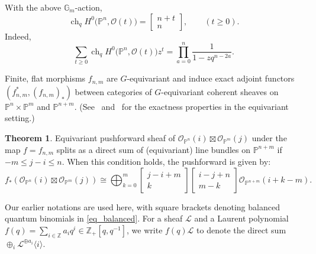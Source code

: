 \documentclass{article}
\def\Z{\mathbb Z}
\newcommand{\mcO}{\mathcal{O}}
\newcommand{\mcL}{\mathcal{L}}
\newcommand{\PP}{\mathbb{P}}
\DeclareMathOperator{\ch}{ch}
\newcommand{\bbinom}[2]{
  \begin{bmatrix}
    #1 \\
    #2
  \end{bmatrix}
}
\theoremstyle{definition}
\newtheorem{thm}{Theorem}[section]
\theoremstyle{definition}
\begin{document}
With the above $\mathbb{G}_m$-action,
\[
\ch_q H^0\bigl(\PP^n, \mathcal{O}(t)\bigr) = \begin{bmatrix} n+t \\ n \end{bmatrix}, \qquad (t \geq 0).
\]
Indeed,
\[
\sum_{t \geq 0} \ch_q H^0\bigl(\PP^n, \mathcal{O}(t)\bigr) z^t = \prod_{a=0}^n \frac{1}{1 - z q^{n-2a}}.
\]

Finite, flat morphisms $f_{n,m}$ are $G$-equivariant and induce exact adjoint functors $(f_{n,m}^{\ast},(f_{n,m})_{\ast})$ between categories of $G$-equivariant coherent sheaves on $\PP^n\times \PP^m$ and $\PP^{n+m}$. (See~\cite[\S 2.2.1.]{Merkurjev} and~\cite[\S 1.5]{Thomason} for the exactness properties in the equivariant setting.)

\begin{thm}\label{thm_pushforward_equiv} Equivariant pushforward sheaf of $\mcO_{\PP^n}(i) \boxtimes \mcO_{\PP^m}(j)$ under the map $f=f_{n,m}$ splits as a direct sum of (equivariant) line bundles on $\PP^{n+m}$ if  $-m \le j - i \le n$. When this condition holds, the pushforward is given by:
\begin{equation}\label{eq_f_decomposition_equiv}
f_{\ast}(\mcO_{\PP^n}(i) \boxtimes \mcO_{\PP^m}(j)) \cong \bigoplus_{k=0}^{m} \bbinom{j-i+m}{k} \bbinom{i-j+n}{m-k}\mcO_{\PP^{n+m}}(i + k - m).
\end{equation}
\end{thm}
Our earlier notations are used here, with square brackets denoting balanced quantum binomials in \eqref{eq_balanced}. For a sheaf $\mcL$ and a Laurent polynomial $f(q)=\sum_{i\in \Z} a_i q^i\in \Z_+[q,q^{-1}]$, we write $f(q)\mcL$ to denote the direct sum $\oplus_i \mcL^{\oplus a_i} \langle i\rangle$.
\end{document}
